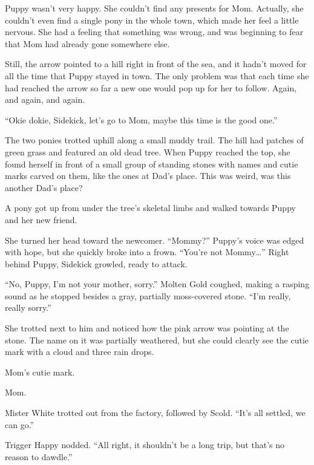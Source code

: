 \horizonline



Puppy wasn't very happy. She couldn't find any presents for Mom. Actually, she couldn't even find a single pony in the whole town, which made her feel a little nervous. She had a feeling that something was wrong, and was beginning to fear that Mom had already gone somewhere else.

Still, the arrow pointed to a hill right in front of the sea, and it hadn't moved for all the time that Puppy stayed in town. The only problem was that each time she had reached the arrow so far a new one would pop up for her to follow. Again, and again, and again.

``Okie dokie, Sidekick, let's go to Mom, maybe this time is the good one.''

The two ponies trotted uphill along a small muddy trail. The hill had patches of green grass and featured an old dead tree. When Puppy reached the top, she found herself in front of a small group of standing stones with names and cutie marks carved on them, like the ones at Dad's place. This was weird, was this another Dad's place?

A pony got up from under the tree's skeletal limbs and walked towards Puppy and her new friend.

She turned her head toward the newcomer. ``Mommy?'' Puppy's voice was edged with hope, but she quickly broke into a frown. ``You're not Mommy\dots'' Right behind Puppy, Sidekick growled, ready to attack.

``No, Puppy, I'm not your mother, sorry.'' Molten Gold coughed, making a rasping sound as he stopped besides a gray, partially moss-covered stone. ``I'm really, really sorry.''

She trotted next to him and noticed how the pink arrow was pointing at the stone. The name on it was partially weathered, but she could clearly see the cutie mark with a cloud and three rain drops.

Mom's cutie mark.

Mom.



\horizonline


Mister White trotted out from the factory, followed by Scold. ``It's all settled, we can go.''

Trigger Happy nodded. ``All right, it shouldn't be a long trip, but that's no reason to dawdle.''

